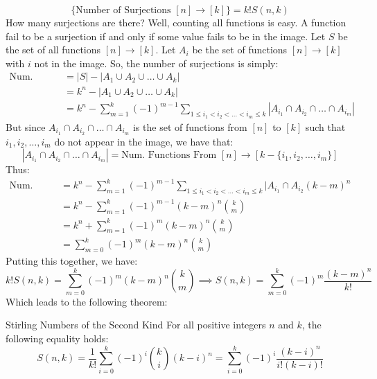 \documentclass[letterpaper]{article}
\begin{document}
\[\{\text{Number of Surjections } [n] \to [k]\} = k!S(n, k)\]
How many surjections are there? Well, counting all functions is easy. A function fail to be a surjection if and only if some value fails to be in the image. Let $S$ be the set of all functions $[n] \to [k]$. Let $A_i$ be the set of functions $[n] \to [k]$ with $i$ not in the image. So, the number of surjections is simply:
\begin{equation*}
    \begin{aligned}
        \text{Num. Surjections} &= |S| - |A_1 \cup A_2 \cup \dots \cup A_k| \\ 
            &= k^n - |A_1 \cup A_2 \cup \dots \cup A_k| \\ 
            &= k^n - \sum_{m = 1}^{k} (-1)^{m - 1} \sum_{1 \leq i_1 < i_2 < \dots < i_m \leq k} |A_{i_1} \cap A_{i_2} \cap \dots \cap A_{i_m}|
    \end{aligned}
\end{equation*}
But since $A_{i_1} \cap A_{i_2} \cap \dots \cap A_{i_m}$ is the set of functions from $[n]$ to $[k]$ such that $i_1, i_2, \dots, i_m$ do not appear in the image, we have that: 
\[|A_{i_1} \cap A_{i_2} \cap \dots \cap A_{i_m}| = \text{Num. Functions From } [n] \to [k - \{i_1, i_2, \dots, i_m\}]\]
Thus:
\begin{equation*}
    \begin{aligned}
        \text{Num. Surjective Functions} &= k^n - \sum_{m = 1}^{k} (-1)^{m - 1} \sum_{1 \leq i_1 < i_2 < \dots < i_m \leq k} |A_{i_1} \cap A_{i_2} (k - m)^n \\ 
            &= k^n - \sum_{m = 1}^{k} (-1)^{m - 1} (k - m)^n \binom{k}{m} \\ 
            &= k^n + \sum_{m = 1}^{k} (-1)^m (k - m)^n \binom{k}{m} \\ 
            &= \sum_{m = 0}^{k} (-1)^m (k - m)^n \binom{k}{m}
    \end{aligned}
\end{equation*}
Putting this together, we have:
\[k!S(n, k) = \sum_{m = 0}^{k} (-1)^m (k - m)^n \binom{k}{m} \implies S(n, k) = \sum_{m = 0}^{k} (-1)^m \frac{(k - m)^n}{k!}\]
Which leads to the following theorem: 
\begin{theorem}{Stirling Numbers of the Second Kind}{}
    For all positive integers $n$ and $k$, the following equality holds:
    \[S(n, k) = \frac{1}{k!} \sum_{i = 0}^k (-1)^i \binom{k}{i} (k - i)^n = \sum_{i = 0}^k (-1)^i \frac{(k - i)^n}{i!(k - i)!}\]
\end{theorem}
\end{document}
